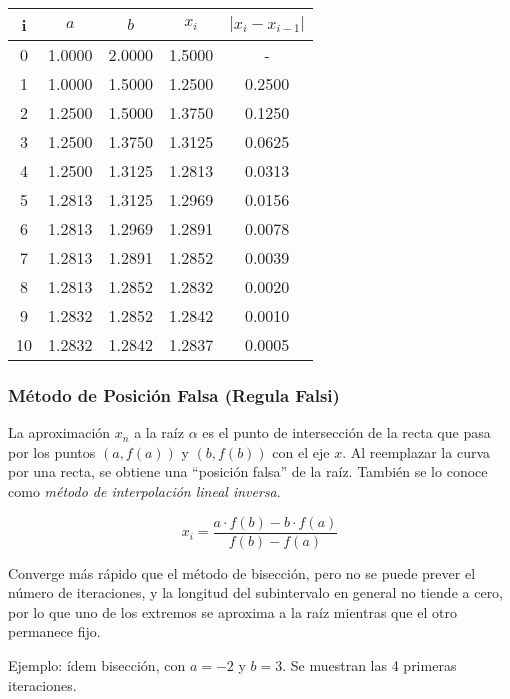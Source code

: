 \documentclass{article}
\begin{document}
\begin{table}[h]
\centering
\begin{tabular}{ccccc}
    i & $a$    & $b$    & $x_i$  & $|x_i - x_{i-1}|$ \\\hline
    0 & 1.0000 & 2.0000 & 1.5000 & -                 \\
    1 & 1.0000 & 1.5000 & 1.2500 & 0.2500            \\
    2 & 1.2500 & 1.5000 & 1.3750 & 0.1250            \\
    3 & 1.2500 & 1.3750 & 1.3125 & 0.0625            \\
    4 & 1.2500 & 1.3125 & 1.2813 & 0.0313            \\
    5 & 1.2813 & 1.3125 & 1.2969 & 0.0156            \\
    6 & 1.2813 & 1.2969 & 1.2891 & 0.0078            \\
    7 & 1.2813 & 1.2891 & 1.2852 & 0.0039            \\
    8 & 1.2813 & 1.2852 & 1.2832 & 0.0020            \\
    9 & 1.2832 & 1.2852 & 1.2842 & 0.0010            \\
   10 & 1.2832 & 1.2842 & 1.2837 & 0.0005
\end{tabular}
\end{table}

\subsubsection{Método de Posición Falsa (Regula Falsi)}

La aproximación $x_n$ a la raíz $\alpha$ es el punto de intersección de la recta
que pasa por los puntos $(a, f(a))$ y $(b, f(b))$ con el eje $x$. Al reemplazar
la curva por una recta, se obtiene una ``posición falsa'' de la raíz. También se
lo conoce como \textit{método de interpolación lineal inversa}.

\begin{equation*}
    x_i = \frac{a\cdot f(b) - b\cdot f(a)}{f(b) - f(a)}
\end{equation*}

Converge más rápido que el método de bisección, pero no se puede prever el 
número de iteraciones, y la longitud del subintervalo en general no tiende a 
cero, por lo que uno de los extremos se aproxima a la raíz mientras que el otro
permanece fijo.

Ejemplo: ídem bisección, con $a=-2$ y $b=3$. Se muestran las 4 primeras
iteraciones.
\end{document}
